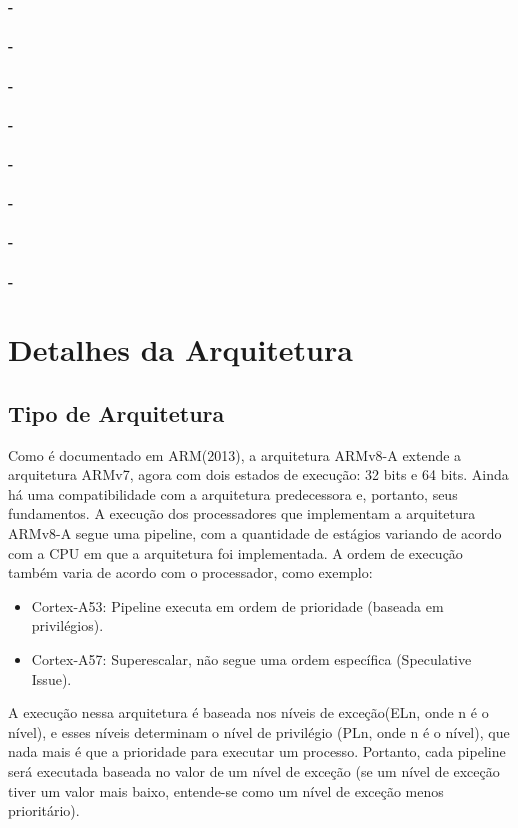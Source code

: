 \documentclass[12pt,a4paper,utf8]{ppgsi}
\begin{document}
\\\\\textbf{-} 
\\\\\textbf{-} 
\\\\\textbf{-} 
\\\\\textbf{-} 
\\\\\textbf{-} 
\\\\\textbf{-} 
\\\\\textbf{-} 
\\\\\textbf{-} 









\section{Detalhes da Arquitetura}
    \subsection{Tipo de Arquitetura}
        Como é documentado em ARM(2013), a arquitetura ARMv8-A extende a arquitetura ARMv7, agora com dois estados de execução: 32 bits e 64 bits. Ainda há  uma compatibilidade com a arquitetura predecessora e, portanto, seus fundamentos.
        A execução dos processadores que implementam a arquitetura ARMv8-A segue uma pipeline, com a quantidade de estágios variando de acordo com a CPU em que a arquitetura foi implementada. A ordem de execução também varia de acordo com o processador, como exemplo:
        \begin{itemize}
            \item Cortex-A53: Pipeline executa em ordem de prioridade (baseada em privilégios).
            \item Cortex-A57: Superescalar, não segue uma ordem específica (Speculative Issue).
        \end{itemize}

        A execução nessa arquitetura é baseada nos níveis de exceção(ELn, onde n é o nível), e esses níveis determinam o nível de privilégio (PLn, onde n é o nível), que nada mais é que a prioridade para executar um processo. Portanto, cada pipeline será executada baseada no valor de um nível de exceção (se um nível de exceção tiver um valor mais baixo, entende-se como um nível de exceção menos prioritário).
\end{document}
